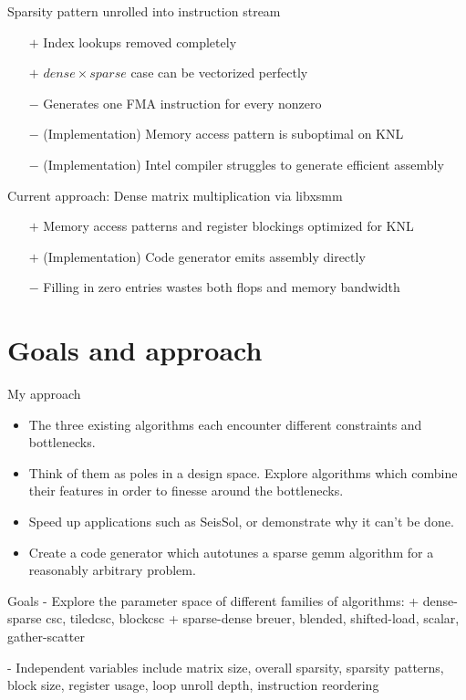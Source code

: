   Sparsity pattern unrolled into instruction stream
    \begin{itemize}
    \item[$+$] Index lookups removed completely
    \item[$+$] $dense \times sparse$ case can be vectorized perfectly 
    \item[$-$] Generates one FMA instruction for every nonzero
    \item[$-$] (Implementation) Memory access pattern is suboptimal on KNL
    \item[$-$] (Implementation) Intel compiler struggles to generate efficient assembly
    \end{itemize}

  Current approach: Dense matrix multiplication via libxsmm
    \begin{itemize}
    \item[$+$] Memory access patterns and register blockings optimized for KNL
    \item[$+$] (Implementation) Code generator emits assembly directly 
    \item[$-$] Filling in zero entries wastes both flops and memory bandwidth
    \end{itemize}


  \section{Goals and approach}
  My approach
    \begin{itemize}
    \item The three existing algorithms each encounter different constraints and bottlenecks.
    \item Think of them as poles in a design space. Explore algorithms which combine their features in order to finesse around the bottlenecks.
    \item Speed up applications such as SeisSol, or demonstrate why it can't be done.
    \item Create a code generator which autotunes a sparse gemm algorithm for a reasonably arbitrary problem.
    \end{itemize}

 Goals
   - Explore the parameter space of different families of algorithms:
     + dense-sparse csc, tiledcsc, blockcsc
     + sparse-dense breuer, blended, shifted-load, scalar, gather-scatter

   - Independent variables include matrix size, overall sparsity, sparsity patterns, block size, register usage, loop unroll depth, instruction reordering

